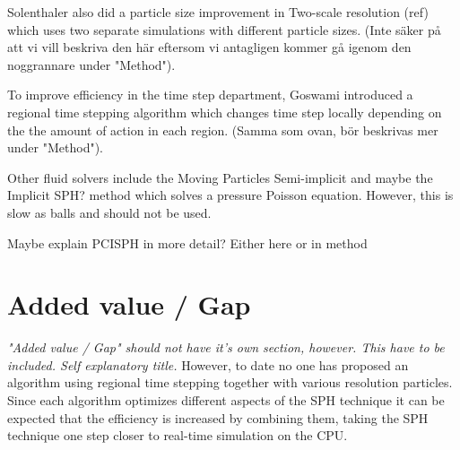 \documentclass[../../main.tex]{subfiles}
\begin{document}
Solenthaler also did a particle size improvement in Two-scale resolution (ref) which uses two separate simulations with different particle sizes. (Inte säker på att vi vill beskriva den här eftersom vi antagligen kommer gå igenom den noggrannare under "Method"). 

To improve efficiency in the time step department, Goswami introduced a regional time stepping algorithm which changes time step locally depending on the the amount of action in each region. (Samma som ovan, bör beskrivas mer under "Method"). 

Other fluid solvers include the Moving Particles Semi-implicit and maybe the Implicit SPH? method which solves a pressure Poisson equation. However, this is slow as balls and should not be used. 


{\color{red}Maybe explain PCISPH in more detail? Either here or in method}

\section{Added value / Gap}
\textit{"Added value / Gap" should not have it's own section, however. This have to be included. Self explanatory title.}
However, to date no one has proposed an algorithm using regional time stepping together with various resolution particles. Since each algorithm optimizes different aspects of the SPH technique it can be expected that the efficiency is increased by combining them, taking the SPH technique one step closer to real-time simulation on the CPU.
\end{document}

